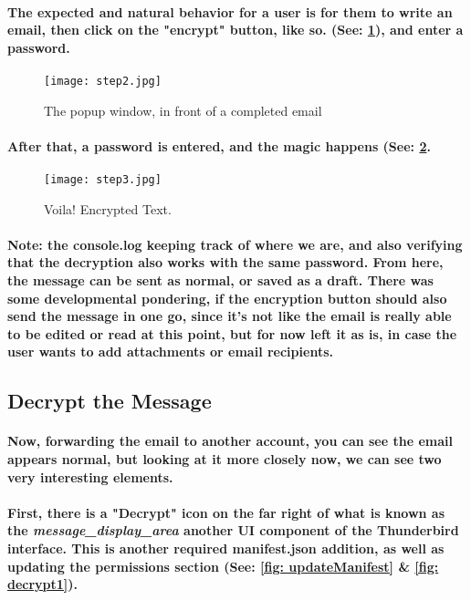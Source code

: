 \paragraph{The expected and natural behavior for a user is for them to write an email, then click on the "encrypt" button, like so. (See: \ref{fig: button}), and enter a password.}

\begin{figure}[H]
    \centering
    \texttt{[image: step2.jpg]}
    \caption{\label{fig: button} The popup window, in front of a completed email}
\end{figure}

\paragraph{After that, a password is entered, and the magic happens (See: \ref{fig: encryptedText}.}

\begin{figure}[H]
    \centering
    \texttt{[image: step3.jpg]}
    \caption{\label{fig: encryptedText} Voila! Encrypted Text.}
\end{figure}

\paragraph{Note: the console.log keeping track of where we are, and also verifying that the decryption also works with the same password. From here, the message can be sent as normal, or saved as a draft. There was some developmental pondering, if the encryption button should also send the message in one go, since it's not like the email is really able to be edited or read at this point, but for now left it as is, in case the user wants to add attachments or email recipients.}


\subsection{Decrypt the Message}
\paragraph{Now, forwarding the email to another account, you can see the email appears normal, but looking at it more closely now, we can see two very interesting elements.}

\paragraph{First, there is a "Decrypt" icon on the far right of what is known as the \emph{message\_display\_area} another UI component of the Thunderbird interface. This is another required manifest.json addition, as well as updating the permissions section (See: \ref{fig: updateManifest} \& \ref{fig: decrypt1}).}

